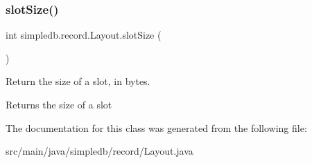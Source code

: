 \subsubsection{\texorpdfstring{slot\+Size()}{slotSize()}}
{\footnotesize\ttfamily int simpledb.\+record.\+Layout.\+slot\+Size (\begin{DoxyParamCaption}{ }\end{DoxyParamCaption})\hspace{0.3cm}{\ttfamily [inline]}}

Return the size of a slot, in bytes. \begin{DoxyReturn}{Returns}
the size of a slot 
\end{DoxyReturn}


The documentation for this class was generated from the following file\+:\begin{DoxyCompactItemize}
\item 
src/main/java/simpledb/record/Layout.\+java\end{DoxyCompactItemize}
